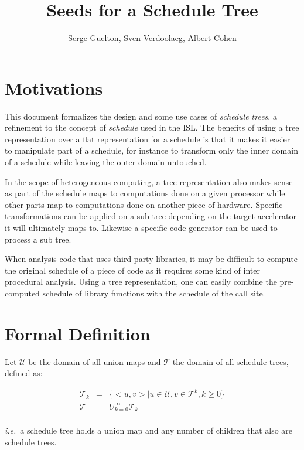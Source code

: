 \documentclass{article}
\title{Seeds for a Schedule Tree} %
\author{Serge Guelton, Sven Verdoolaeg, Albert Cohen}
\begin{document}
\maketitle

\section*{Motivations}

This document formalizes the design and some use cases of \emph{schedule
trees}, a refinement to the concept of \emph{schedule} used in the \ac{ISL}. The
benefits of using a tree representation over a flat representation for a
schedule is that it makes it easier to manipulate part of a schedule, for
instance to transform only the inner domain of a schedule while leaving the
outer domain untouched.

In the scope of heterogeneous computing, a tree representation also makes sense
as part of the schedule maps to computations done on a given processor while
other parts map to computations done on another piece of hardware. Specific
transformations can be applied on a sub tree depending on the target
accelerator it will ultimately maps to. Likewise a specific code generator can
be used to process a sub tree.

When analysis code that uses third-party libraries, it may be difficult to
compute the original schedule of a piece of code as it requires some kind of
inter procedural analysis. Using a tree representation, one can easily combine
the pre-computed schedule of library functions with the schedule of the call
site.

\section{Formal Definition}

Let $\mathcal{U}$ be the domain of all union maps and $\mathcal{T}$ the domain
of all schedule trees, defined as:

\[
    \begin{array}{lcl}
        \mathcal{T}_k &=& \{ <u, v> | u \in \mathcal{U}, v \in \mathcal{T}^k, k \ge 0 \} \\
        \mathcal{T} &=& U_{k=0}^\infty \mathcal{T}_k\\
    \end{array}
\]

\noindent \emph{i.e.}\ a schedule tree holds a union map and any number of children that also are schedule trees.
\end{document}
